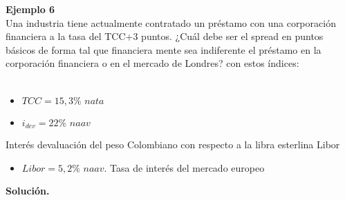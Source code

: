 \newpage
\textbf{Ejemplo 6}\\
Una industria tiene actualmente contratado un préstamo con una
corporación financiera a la tasa del TCC+3 puntos. ¿Cuál debe ser el spread
en puntos básicos de forma tal que financiera mente sea indiferente el
préstamo en la corporación financiera o en el mercado de Londres? con
estos índices:\\ \\
\begin{itemize}
 \item $TCC = 15,3\% \textit{ nata}$
 \item $i_{dev} = 22\% \textit{ naav}$
\end{itemize}
Interés devaluación del peso Colombiano con respecto a la libra esterlina Libor
\begin{itemize}
 \item  $Libor= 5,2\% \textit{ naav}$. Tasa de interés del mercado europeo
\end{itemize}
\textbf{Solución.}\\
